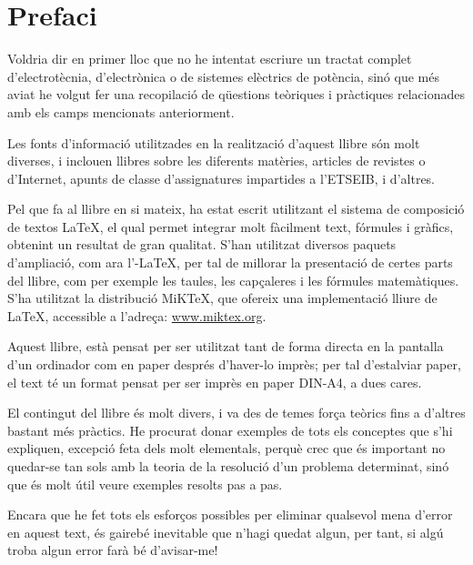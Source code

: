 \chapter*{Prefaci} 

   Voldria dir en primer lloc que no he intentat escriure un tractat complet
   d'electrot\`{e}cnia, d'electr\`{o}nica o de sistemes el\`{e}ctrics de pot\`{e}ncia, sin\'{o} que m\'{e}s aviat
   he volgut
   fer una recopilaci\'{o} de q\"{u}estions te\`{o}riques i pr\`{a}ctiques relacionades amb els camps mencionats
   anteriorment.

   Les fonts d'informaci\'{o} utilitzades en la realitzaci\'{o} d'aquest llibre s\'{o}n molt diverses,
   i inclouen llibres sobre les diferents mat\`{e}ries, articles de revistes o d'Internet,
   apunts de classe d'assignatures impartides a l'\textsf{ETSEIB}, i d'altres.

   Pel que fa al llibre en si mateix, ha estat escrit utilitzant el sistema de composici\'{o} de
   textos \LaTeX, el qual
   permet integrar molt f\`{a}cilment text, f\'{o}rmules i gr\`{a}fics, obtenint un resultat de
   gran qualitat. S'han utilitzat diversos paquets d'ampliaci\'{o}, com ara
   l'\AmS-\LaTeX,
   per tal de millorar la presentaci\'{o} de certes parts del
   llibre, com per exemple les taules, les cap\c{c}aleres i les f\'{o}rmules matem\`{a}tiques. S'ha utilitzat la distribuci\'{o} MiK\TeX, que ofereix una implementaci\'{o} lliure de \LaTeX , accessible a l'adre\c{c}a: \href{http://www.miktex.org/}{www.miktex.org}.

   Aquest llibre, est\`{a} pensat per ser utilitzat tant de forma directa en la pantalla d'un
   ordinador com en paper despr\'{e}s d'haver-lo impr\`{e}s; per tal d'estalviar paper, el text
   t\'{e} un format pensat per ser impr\`{e}s en paper DIN-A4, a dues cares.

    El contingut del llibre \'{e}s molt divers, i va des de temes for\c{c}a te\`{o}rics fins a
    d'altres bastant m\'{e}s pr\`{a}ctics. He procurat donar exemples de tots els conceptes
    que s'hi expliquen, excepci\'{o} feta dels molt elementals, perqu\`{e} crec que \'{e}s important
     no quedar-se tan sols amb la teoria de  la resoluci\'{o} d'un problema determinat, sin\'{o} que
     \'{e}s molt \'{u}til veure exemples resolts pas a pas.

    Encara que he fet tots els esfor\c{c}os possibles per eliminar qualsevol
    mena  d'error en aquest text, \'{e}s gaireb\'{e} inevitable que n'hagi quedat algun,
    per tant, si alg\'{u} troba algun error far\`{a} b\'{e} d'avisar-me!


